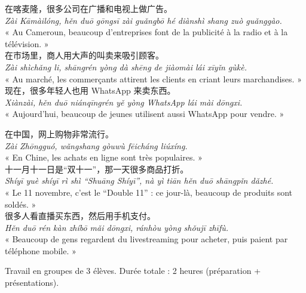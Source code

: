 \documentclass[11pt]{article}
\newcounter{popsec}
\newcounter{popsub}
\newcommand{\courssub}[1]{%
  \stepcounter{popsub}%
  \par\vspace{9pt}\noindent{\popxbold\fontsize{11.5}{13}\selectfont\color{popink}{\color{poporange}\thepopsec.\thepopsub}\hspace{6pt}#1}\par\nopagebreak\vspace{4pt}
}
\begin{document}
\begin{textebox}
在喀麦隆，很多公司在广播和电视上做广告。\\
\emph{Zài Kāmàilóng, hěn duō gōngsī zài guǎngbō hé diànshì shang zuò guǎnggào.}\\
« Au Cameroun, beaucoup d'entreprises font de la publicité à la radio et à la télévision. »\\[4pt]
在市场里，商人用大声的叫卖来吸引顾客。\\
\emph{Zài shìchǎng li, shāngrén yòng dà shēng de jiàomài lái xīyǐn gùkè.}\\
« Au marché, les commerçants attirent les clients en criant leurs marchandises. »\\[4pt]
现在，很多年轻人也用 WhatsApp 来卖东西。\\
\emph{Xiànzài, hěn duō niánqīngrén yě yòng WhatsApp lái mài dōngxi.}\\
« Aujourd'hui, beaucoup de jeunes utilisent aussi WhatsApp pour vendre. »
\end{textebox}

\begin{textebox}
在中国，网上购物非常流行。\\
\emph{Zài Zhōngguó, wǎngshang gòuwù fēicháng liúxíng.}\\
« En Chine, les achats en ligne sont très populaires. »\\[4pt]
十一月十一日是“双十一”，那一天很多商品打折。\\
\emph{Shíyī yuè shíyī rì shì ``Shuāng Shíyī'', nà yì tiān hěn duō shāngpǐn dǎzhé.}\\
« Le 11 novembre, c'est le ``Double 11'' : ce jour-là, beaucoup de produits sont soldés. »\\[4pt]
很多人看直播买东西，然后用手机支付。\\
\emph{Hěn duō rén kàn zhíbō mǎi dōngxi, ránhòu yòng shǒujī zhīfù.}\\
« Beaucoup de gens regardent du livestreaming pour acheter, puis paient par téléphone mobile. »
\end{textebox}

\courssub{Consignes}

Travail en groupes de 3 élèves. Durée totale : 2 heures (préparation + présentations).
\end{document}
